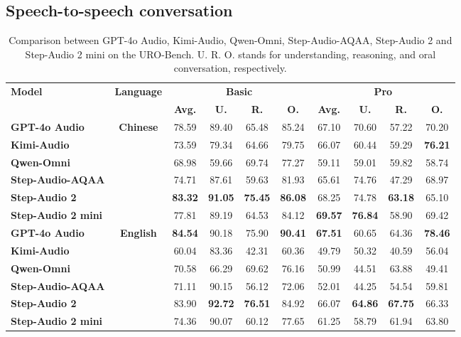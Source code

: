 \subsection{Speech-to-speech conversation}
\begin{table}[h]
\centering
\caption{Comparison between GPT-4o Audio, Kimi-Audio, Qwen-Omni, Step-Audio-AQAA, Step-Audio 2 and Step-Audio 2 mini on the URO-Bench. U. R. O. stands for understanding, reasoning, and oral conversation, respectively.}
\begin{tabular}{lccccccccc}
\toprule
\multirow{2}{*}{\textbf{Model}} & \multirow{2}{*}{\textbf{Language}} & \multicolumn{4}{c}{\textbf{Basic}}& \multicolumn{4}{c}{\textbf{Pro}}\\
\cmidrule(lr){3-6} \cmidrule(lr){7-10}
&&\textbf{Avg.} & \textbf{U.} & \textbf{R.} & \textbf{O.} & \textbf{Avg.} & \textbf{U.} & \textbf{R.} & \textbf{O.} \\
\midrule
\textbf{GPT-4o Audio}&  \multirow{6}{*}{\textbf{Chinese}}&78.59&89.40 &65.48 &85.24 &67.10&70.60 &57.22 & 70.20 \\
\textbf{Kimi-Audio} &                                    &73.59&79.34 &64.66 &79.75 &66.07&60.44 &59.29 & \textbf{76.21} \\
\textbf{Qwen-Omni} &                                     &68.98&59.66 &69.74 &77.27 &59.11&59.01 &59.82 & 58.74 \\
\textbf{Step-Audio-AQAA} &                               &74.71&87.61 &59.63 &81.93 &65.61&74.76  &47.29  & 68.97 \\
\textbf{Step-Audio 2} &                                  &\textbf{83.32}&\textbf{91.05} &\textbf{75.45} & \textbf{86.08} &68.25 &74.78 &\textbf{63.18} & 65.10  \\
\textbf{Step-Audio 2 mini} &                             &77.81&89.19 &64.53 &84.12 &\textbf{69.57}&\textbf{76.84} &58.90 & 69.42 \\
\midrule
\textbf{GPT-4o Audio}&  \multirow{6}{*}{\textbf{English}}&\textbf{84.54}&90.18 &75.90 &\textbf{90.41} &\textbf{67.51}&60.65 &64.36 &\textbf{78.46} \\
\textbf{Kimi-Audio} &                                    &60.04&83.36 &42.31 &60.36 &49.79&50.32 &40.59 &56.04 \\
\textbf{Qwen-Omni} &                                     &70.58&66.29 &69.62 &76.16 &50.99&44.51 &63.88 &49.41 \\
\textbf{Step-Audio-AQAA} &                               &71.11&90.15 &56.12 &72.06 &52.01&44.25 &54.54 &59.81 \\
\textbf{Step-Audio 2} &                                  &83.90&\textbf{92.72} &\textbf{76.51} &84.92 &66.07 &\textbf{64.86} &\textbf{67.75}&66.33 \\
\textbf{Step-Audio 2 mini} &                             &74.36&90.07 &60.12 &77.65 &61.25&58.79 &61.94 & 63.80 \\
\bottomrule
\end{tabular}
\label{tab:uro-7b}
\end{table}